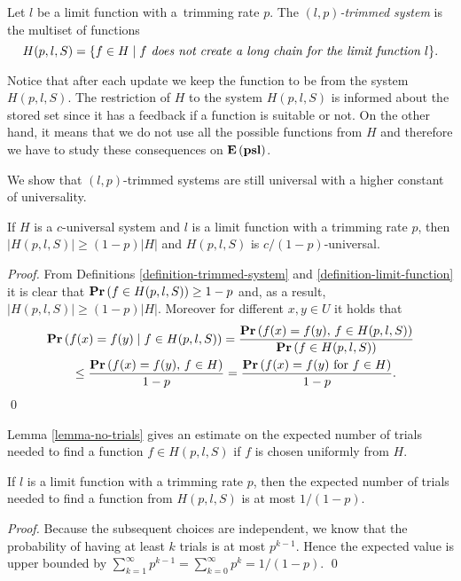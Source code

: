 \begin{definition}
\label{definition-trimmed-system}
Let $l$ be a limit function with a~trimming rate $p$.
The \emph{$(l, p)$-trimmed system} is the multiset of functions \[ H(p, l, S) = \{ f \in H \mid f \textit{ does not create a long chain for the limit function $l$} \}. \]
\end{definition}

Notice that after each update we keep the function to be from the system $H(p, l, S)$.
The restriction of $H$ to the system $H(p, l, S)$ is informed about the stored set since it has a feedback if a function is suitable or not.
On the other hand, it means that we do not use all the possible functions from $H$ and therefore we have to study these consequences on $\mathbf{E}\left(\mathbf{psl}\right)$.

We show that $(l, p)$-trimmed systems are still universal with a higher constant of universality.
\begin{lemma}
\label{lemma-trimmed-system}
If $H$ is a $c$-universal system and $l$ is a limit function with a trimming rate $p$, then $|H(p, l, S)| \geq (1 - p)|H|$ and $H(p, l, S)$ is $c/(1 - p)$-universal.
\end{lemma}
\begin{proof}
From Definitions \ref{definition-trimmed-system} and \ref{definition-limit-function} it is clear that $\mathbf{Pr}\left(f \in H(p, l, S)\right) \geq 1 - p$ and, as a result, $|H(p, l, S)| \geq (1 - p)|H|$.
Moreover for different $x, y \in U$ it holds that
\[
\begin{split}
& \mathbf{Pr}\left(f(x) = f(y) \mid f \in H(p, l, S)\right) 
	= \frac{\mathbf{Pr}\left(f(x) = f(y),\, f \in H(p, l, S)\right)}{\mathbf{Pr}\left(f \in H(p, l, S)\right)} \\
	& \qquad \leq \frac{\mathbf{Pr}\left(f(x) = f(y),\, f \in H\right)}{1 - p} = \frac{\mathbf{Pr}\left(f(x) = f(y) \mbox{ for } f \in H\right)}{1 - p}. \\
\end{split}
\]
\qed
\end{proof}

Lemma \ref{lemma-no-trials} gives an estimate on the expected number of trials needed to find a function $f \in H(p, l, S)$ if $f$ is chosen uniformly from $H$.
\begin{lemma}
\label{lemma-no-trials}
If $l$ is a limit function with a trimming rate $p$, then the expected number of trials needed to find a function from $H(p, l, S)$ is at most ${1}/{(1 - p)}$.
\end{lemma}
\begin{proof}
Because the subsequent choices are independent, we know that the probability of having at least $k$ trials is at most $p^{k - 1}$. 
Hence the expected value is upper bounded by $\sum_{k = 1}^{\infty} p^{k - 1} = \sum_{k = 0}^{\infty} p^k = {1}/{(1 - p)}.$
\qed
\end{proof}


